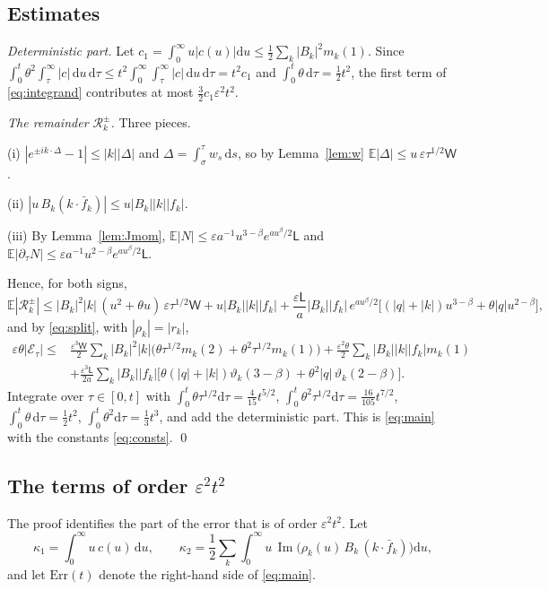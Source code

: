 \documentclass[11pt]{article}
\newcommand{\dd}{\mathrm{d}}
\newcommand{\E}{\mathbb{E}}
\newcommand{\eps}{\varepsilon}
\newcommand{\cR}{\mathcal{R}}
\newcommand{\cE}{\mathcal{E}}
\newcommand{\sL}{\mathsf{L}}
\newcommand{\sW}{\mathsf{W}}
\renewcommand{\Im}{\operatorname{Im}}
\theoremstyle{remark}
\begin{document}
\subsection{Estimates}

\emph{Deterministic part.} Let $c_1 = \int_0^\infty u|c(u)|\dd u
\le\frac12\sum_k|B_k|^2m_k(1)$. Since
$\int_0^t\theta^2\int_\tau^\infty|c|\,\dd u\,\dd\tau
\le t^2\int_0^\infty\!\int_\tau^\infty|c|\,\dd u\,\dd\tau = t^2c_1$ and
$\int_0^t\theta\,\dd\tau = \frac12t^2$, the first term of
\eqref{eq:integrand} contributes at most $\frac32c_1\eps^2t^2$.

\emph{The remainder $\cR_k^\pm$.} Three pieces.

(i) $|e^{\pm ik\cdot\Delta}-1|\le|k||\Delta|$ and
$\Delta = \int_\sigma^\tau w_s\,\dd s$, so by Lemma~\ref{lem:w}
$\E|\Delta|\le u\,\eps\tau^{1/2}\sW$.

(ii) $|u\,B_k(k\cdot\bar f_k)|\le u|B_k||k||f_k|$.

(iii) By Lemma~\ref{lem:Jmom},
$\E|N|\le\eps a^{-1}u^{3-\beta}e^{au^\beta/2}\sL$ and
$\E|\partial_\tau N|\le\eps a^{-1}u^{2-\beta}e^{au^\beta/2}\sL$.

Hence, for both signs,
\[
  \E|\cR_k^\pm|\le|B_k|^2|k|\,(u^2+\theta u)\,\eps\tau^{1/2}\sW
   + u|B_k||k||f_k|
   + \frac{\eps\sL}{a}|B_k||f_k|\,e^{au^\beta/2}
     \bigl[(|q|+|k|)u^{3-\beta}+\theta|q|u^{2-\beta}\bigr],
\]
and by \eqref{eq:split}, with $|\rho_k| = |r_k|$,
\begin{align*}
  \eps\theta|\cE_\tau|\le{}&
   \frac{\eps^3\sW}{2}\sum_k|B_k|^2|k|\bigl(\theta\tau^{1/2}m_k(2)+\theta^2\tau^{1/2}m_k(1)\bigr)
   + \frac{\eps^2\theta}{2}\sum_k|B_k||k||f_k|m_k(1)\\
  &+ \frac{\eps^3\sL}{2a}\sum_k|B_k||f_k|\bigl[\theta(|q|+|k|)\vartheta_k(3-\beta)
      + \theta^2|q|\,\vartheta_k(2-\beta)\bigr].
\end{align*}
Integrate over $\tau\in[0,t]$ with
$\int_0^t\theta\tau^{1/2}\dd\tau = \frac4{15}t^{5/2}$,
$\int_0^t\theta^2\tau^{1/2}\dd\tau = \frac{16}{105}t^{7/2}$,
$\int_0^t\theta\,\dd\tau = \frac12t^2$,
$\int_0^t\theta^2\dd\tau = \frac13t^3$, and add the deterministic part. This
is \eqref{eq:main} with the constants \eqref{eq:consts}. \qed

\subsection{The terms of order $\eps^2t^2$}

The proof identifies the part of the error that is of order $\eps^2t^2$.
Let
\begin{equation}
  \kappa_1 = \int_0^\infty u\,c(u)\,\dd u,\qquad
  \kappa_2 = \frac12\sum_k\int_0^\infty u\,
     \Im\bigl(\rho_k(u)\,B_k\,(k\cdot\bar f_k)\bigr)\dd u ,
\end{equation}
and let $\mathrm{Err}(t)$ denote the right-hand side of \eqref{eq:main}.
\end{document}
